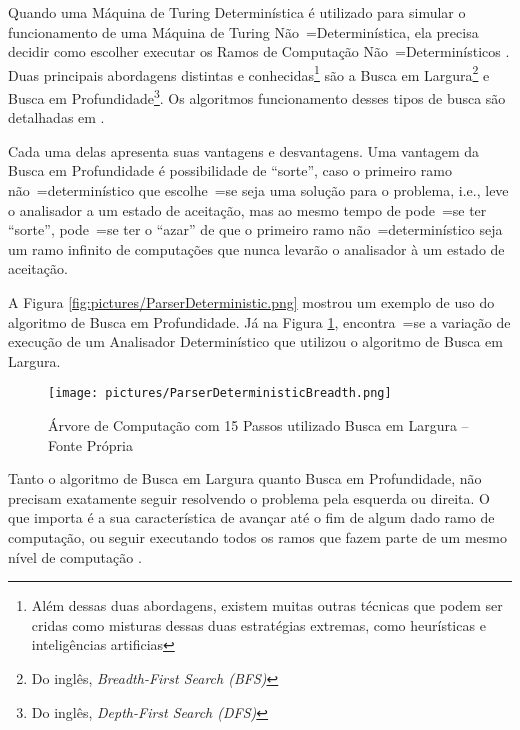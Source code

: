 {    Quando uma Máquina de Turing Determinística é utilizado para simular o funcionamento de uma Máquina de Turing Não~=Determinística,
    ela precisa decidir como escolher executar os Ramos de Computação Não~=Determinísticos \cite{sipserBook}.
    Duas principais abordagens distintas e
    conhecidas\footnote{
    Além dessas duas abordagens,
    existem muitas outras técnicas que podem ser cridas como misturas dessas duas estratégias extremas,
    como heurísticas e inteligências artificias
    }
    são a Busca em Largura\footnote{
    Do inglês, \textit{Breadth-First Search (BFS)}
    }
    e Busca em Profundidade\footnote{
    Do inglês, \textit{Depth-First Search (DFS)}
    }.
    Os algoritmos funcionamento desses tipos de busca são detalhadas em .

    Cada uma delas apresenta suas vantagens e
    desvantagens.
    Uma vantagem da Busca em Profundidade é possibilidade de ``sorte'',
    caso o primeiro ramo não~=determinístico que escolhe~=se seja uma solução para o problema,
    i.e.,
    leve o analisador a um estado de aceitação,
    mas ao mesmo tempo de pode~=se ter ``sorte'',
    pode~=se ter o ``azar'' de que o primeiro ramo não~=determinístico seja um ramo infinito de computações que nunca levarão o analisador à um estado de aceitação.

    A Figura \ref{fig:pictures/ParserDeterministic.png} mostrou um exemplo de uso do algoritmo de Busca em Profundidade.
    Já na Figura \ref{fig:pictures/ParserDeterministicBreadth.png},
    encontra~=se a variação de execução de um Analisador Determinístico que utilizou o algoritmo de Busca em Largura.
    \begin{figure}[h]
    \centering
    \texttt{[image: pictures/ParserDeterministicBreadth.png]}
    \caption[Árvore de Computação com 15 Passos utilizado Busca em Largura]{Árvore de Computação com 15 Passos utilizado Busca em Largura -- Fonte Própria}
    \label{fig:pictures/ParserDeterministicBreadth.png}
    \end{figure}

    Tanto o algoritmo de Busca em Largura quanto Busca em Profundidade,
    não precisam exatamente seguir resolvendo o problema pela esquerda ou
    direita.
    O que importa é a sua característica de avançar até o fim de algum dado ramo de computação,
    ou seguir executando todos os ramos que fazem parte de um mesmo nível de computação \cite{cormenIntroductionToAlgorithms,efficientBreadthFirstSearch}.
}


